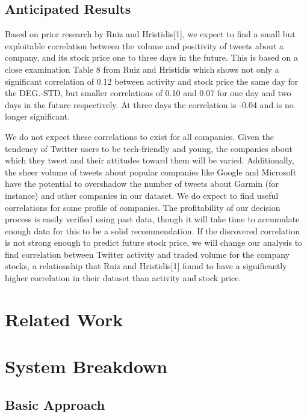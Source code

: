 \documentclass[letterpaper]{article}
\begin{document}
\subsection{Anticipated Results}
Based on prior research by Ruiz and Hristidis[1], we expect to find a small but exploitable correlation between the volume and positivity of tweets about a company, and its stock price one to three days in the future. This is based on a close examination Table 8 from Ruiz and Hristidis which shows not only a significant correlation of 0.12 between activity and stock price the same day for the DEG.-STD, but smaller correlations of 0.10 and 0.07 for one day and two days in the future respectively. At three days the correlation is -0.04 and is no longer significant.

We do not expect these correlations to exist for all companies. Given the tendency of Twitter users to be tech-friendly and young, the companies about which they tweet and their attitudes toward them will be varied. Additionally, the sheer volume of tweets about popular companies like Google and Microsoft have the potential to overshadow the number of tweets about Garmin (for instance) and other companies in our dataset. We do expect to find useful correlations for some profile of companies. The profitability of our decision process is easily verified using past data, though it will take time to accumulate enough data for this to be a solid recommendation. If the discovered correlation is not strong enough to predict future stock price, we will change our analysis to find correlation between Twitter activity and traded volume for the company stocks, a relationship that Ruiz and Hristidis[1] found to have a significantly higher correlation in their dataset than activity and stock price.

\section{Related Work}

\section{System Breakdown}

\subsection{Basic Approach}
\end{document}
